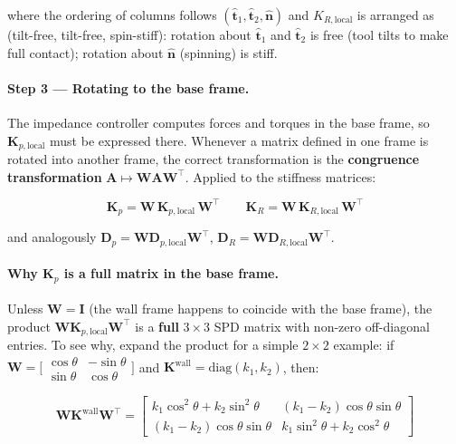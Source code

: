 where the ordering of columns follows $(\hat{\mathbf{t}}_1,
\hat{\mathbf{t}}_2, \hat{\mathbf{n}})$ and $K_{R,\mathrm{local}}$
is arranged as (tilt-free, tilt-free, spin-stiff):
rotation about $\hat{\mathbf{t}}_1$ and $\hat{\mathbf{t}}_2$ is free
(tool tilts to make full contact); rotation about $\hat{\mathbf{n}}$
(spinning) is stiff.

\paragraph{Step 3 --- Rotating to the base frame.}
The impedance controller computes forces and torques in the base frame,
so $\mathbf{K}_{p,\mathrm{local}}$ must be expressed there.
Whenever a matrix defined in one frame is rotated into another frame,
the correct transformation is the \textbf{congruence transformation}
$\mathbf{A} \mapsto \mathbf{W}\mathbf{A}\mathbf{W}^\top$.
Applied to the stiffness matrices:

\begin{equation}
\label{eq:K_base}
\mathbf{K}_p = \mathbf{W}\,\mathbf{K}_{p,\mathrm{local}}\,\mathbf{W}^\top
\qquad
\mathbf{K}_R = \mathbf{W}\,\mathbf{K}_{R,\mathrm{local}}\,\mathbf{W}^\top
\end{equation}

and analogously $\mathbf{D}_p = \mathbf{W}\mathbf{D}_{p,\mathrm{local}}\mathbf{W}^\top$,
$\mathbf{D}_R = \mathbf{W}\mathbf{D}_{R,\mathrm{local}}\mathbf{W}^\top$.

\paragraph{Why $\mathbf{K}_p$ is a full matrix in the base frame.}
Unless $\mathbf{W}=\mathbf{I}$ (the wall frame happens to coincide with
the base frame), the product $\mathbf{W}\mathbf{K}_{p,\mathrm{local}}\mathbf{W}^\top$
is a \textbf{full} $3\times3$ SPD matrix with non-zero off-diagonal entries.
To see why, expand the product for a simple $2\times2$ example: if
$\mathbf{W}=\bigl[\begin{smallmatrix}\cos\theta&-\sin\theta\\\sin\theta&\cos\theta\end{smallmatrix}\bigr]$
and $\mathbf{K}^{\mathrm{wall}}=\mathrm{diag}(k_1,k_2)$, then:

\begin{equation}
\mathbf{W}\mathbf{K}^{\mathrm{wall}}\mathbf{W}^\top
=
\begin{bmatrix}
k_1\cos^2\theta + k_2\sin^2\theta & (k_1-k_2)\cos\theta\sin\theta \\
(k_1-k_2)\cos\theta\sin\theta     & k_1\sin^2\theta + k_2\cos^2\theta
\end{bmatrix}
\end{equation}

